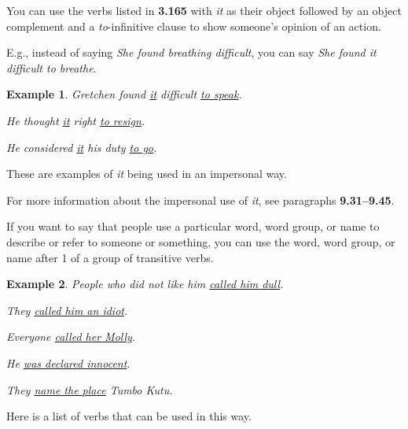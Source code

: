 \documentclass[oneside]{book}
\numberwithin{equation}{section}
\newtheorem{example}{Example}[section]
\begin{document}
%
\noindent{} You can use the verbs listed in \textbf{3.165} with \textit{it} as their object followed by an object complement and a \textit{to}-infinitive clause to show someone's opinion of an action.

E.g., instead of saying \textit{She found breathing difficult}, you can say \textit{She found it difficult to breathe}.
\begin{example}
    Gretchen found \underline{it} difficult \underline{to speak}.
    
    He thought \underline{it} right \underline{to resign}.
    
    He considered \underline{it} his duty \underline{to go}.
\end{example}
These are examples of \textit{it} being used in an impersonal way.

For more information about the impersonal use of \textit{it}, see paragraphs \textbf{9.31--9.45}.

%
\noindent{} If you want to say that people use a particular word, word group, or name to describe or refer to someone or something, you can use the word, word group, or name after 1 of a group of transitive verbs.
\begin{example}
    People who did not like him \underline{called him dull}.
    
    They \underline{called him an idiot}.
    
    Everyone \underline{called her Molly}.
    
    He \underline{was declared innocent}.
    
    They \underline{name the place} Tumbo Kutu.
\end{example}
Here is a list of verbs that can be used in this way.
\end{document}
